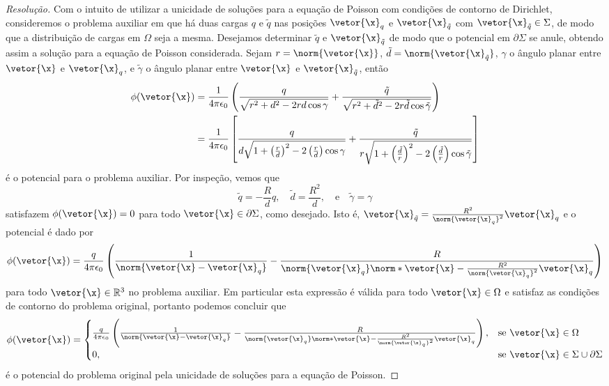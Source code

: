 \begin{proof}[Resolução]
    Com o intuito de utilizar a unicidade de soluções para a equação de Poisson com condições de contorno de Dirichlet, consideremos o problema auxiliar em que há duas cargas \(q\) e \(\tilde{q}\) nas posições \(\vetor{\x}_q\) e \(\vetor{\x}_{\tilde{q}}\) com \(\vetor{\x}_{\tilde{q}} \in \Sigma\), de modo que a distribuição de cargas em \(\Omega\) seja a mesma. Desejamos determinar \(\tilde{q}\) e \(\vetor{\x}_{\tilde{q}}\) de modo que o potencial em \(\partial \Sigma\) se anule, obtendo assim a solução para a equação de Poisson considerada. Sejam \(r = \norm{\vetor{\x}}\), \(\tilde{d} = \norm{\vetor{\x}_{\tilde{q}}}\), \(\gamma\) o ângulo planar entre \(\vetor{\x}\) e \(\vetor{\x}_q\), e \(\tilde{\gamma}\) o ângulo planar entre \(\vetor{\x}\) e \(\vetor{\x}_{\tilde{q}}\), então
    \begin{align*}
        \phi(\vetor{\x}) &= \frac{1}{4\pi \epsilon_0} \left(\frac{q}{\sqrt{r^2 + d^2 - 2rd \cos \gamma}} + \frac{\tilde{q}}{\sqrt{r^2 + \tilde{d}^2 - 2r\tilde{d} \cos\tilde{\gamma}}}\right)\\
                         &= \frac{1}{4\pi \epsilon_0} \left[\frac{q}{d\sqrt{1 + \left(\frac{r}{d}\right)^2 - 2 \left(\frac{r}{d}\right)\cos \gamma}} + \frac{\tilde{q}}{r\sqrt{1 + \left(\frac{\tilde{d}}{r}\right)^2 - 2 \left(\frac{\tilde{d}}{r}\right)\cos\tilde{\gamma}}}\right]
    \end{align*}
    é o potencial para o problema auxiliar. Por inspeção, vemos que
    \begin{equation*}
        \tilde{q} = - \frac{R}{d}q,
        \quad
        \tilde{d} = \frac{R^2}{d},
        \quad\text{e}\quad
        \tilde{\gamma} = \gamma
    \end{equation*}
    satisfazem \(\phi(\vetor{\x}) = 0\) para todo \(\vetor{\x} \in \partial \Sigma\), como desejado. Isto é, \(\vetor{\x}_{\tilde{q}} = \frac{R^2}{\norm{\vetor{\x}_q}^2}\vetor{\x}_q\) e o potencial é dado por
    \begin{equation*}
        \phi(\vetor{\x}) = \frac{q}{4\pi \epsilon_0} \left(\frac{1}{\norm{\vetor{\x} - \vetor{\x}_q}} - \frac{R}{\norm{\vetor{\x}_q}\norm*{\vetor{\x} - \frac{R^2}{\norm{\vetor{\x}_q}^2}\vetor{\x}_q}}\right)
    \end{equation*}
    para todo \(\vetor{\x} \in \mathbb{R}^3\) no problema auxiliar. Em particular esta expressão é válida para todo \(\vetor{\x} \in \Omega\) e satisfaz as condições de contorno do problema original, portanto podemos concluir que
    \begin{equation*}
        \phi(\vetor{\x}) = \begin{cases}
            \frac{q}{4\pi \epsilon_0} \left(\frac{1}{\norm{\vetor{\x} - \vetor{\x}_q}} - \frac{R}{\norm{\vetor{\x}_q}\norm*{\vetor{\x} - \frac{R^2}{\norm{\vetor{\x}_q}^2}\vetor{\x}_q}}\right),&\text{se }\vetor{\x} \in \Omega\\
            0, &\text{se } \vetor{\x}\in \Sigma \cup \partial \Sigma
        \end{cases}
    \end{equation*}
    é o potencial do problema original pela unicidade de soluções para a equação de Poisson.


\end{proof}
